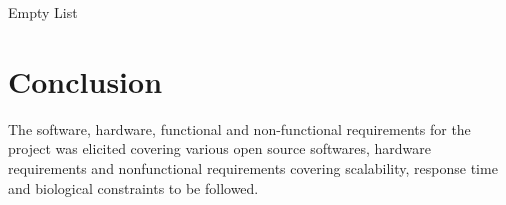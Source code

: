  \begin{list}{}{}
  \item Empty List
 \end{list}

 
\section{Conclusion}
The software, hardware, functional and non-functional requirements for the project was elicited covering various open source softwares, 
hardware requirements and nonfunctional requirements covering scalability, response time and biological constraints to be followed.


